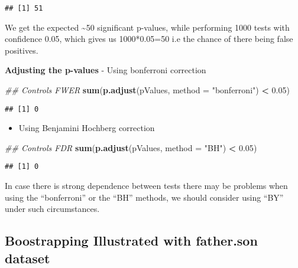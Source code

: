 \documentclass[
]{article}
\newenvironment{Shaded}{\begin{snugshade}}{\end{snugshade}}
\newcommand{\CommentTok}[1]{\textcolor[rgb]{0.56,0.35,0.01}{\textit{#1}}}
\newcommand{\DataTypeTok}[1]{\textcolor[rgb]{0.13,0.29,0.53}{#1}}
\newcommand{\FloatTok}[1]{\textcolor[rgb]{0.00,0.00,0.81}{#1}}
\newcommand{\KeywordTok}[1]{\textcolor[rgb]{0.13,0.29,0.53}{\textbf{#1}}}
\newcommand{\NormalTok}[1]{#1}
\newcommand{\OperatorTok}[1]{\textcolor[rgb]{0.81,0.36,0.00}{\textbf{#1}}}
\newcommand{\StringTok}[1]{\textcolor[rgb]{0.31,0.60,0.02}{#1}}
\providecommand{\tightlist}{%
  \setlength{\itemsep}{0pt}\setlength{\parskip}{0pt}}
\begin{document}
\begin{verbatim}
## [1] 51
\end{verbatim}

We get the expected \textasciitilde50 significant p-values, while
performing 1000 tests with confidence 0.05, which gives us 1000*0.05=50
i.e the chance of there being false positives.

\textbf{Adjusting the p-values} - Using bonferroni correction

\begin{Shaded}
\begin{Highlighting}[]
\CommentTok{## Controls FWER}
\KeywordTok{sum}\NormalTok{(}\KeywordTok{p.adjust}\NormalTok{(pValues, }\DataTypeTok{method =} \StringTok{"bonferroni"}\NormalTok{) }\OperatorTok{<}\StringTok{ }\FloatTok{0.05}\NormalTok{)}
\end{Highlighting}
\end{Shaded}

\begin{verbatim}
## [1] 0
\end{verbatim}

\begin{itemize}
\tightlist
\item
  Using Benjamini Hochberg correction
\end{itemize}

\begin{Shaded}
\begin{Highlighting}[]
\CommentTok{## Controls FDR}
\KeywordTok{sum}\NormalTok{(}\KeywordTok{p.adjust}\NormalTok{(pValues, }\DataTypeTok{method =} \StringTok{"BH"}\NormalTok{) }\OperatorTok{<}\StringTok{ }\FloatTok{0.05}\NormalTok{)}
\end{Highlighting}
\end{Shaded}

\begin{verbatim}
## [1] 0
\end{verbatim}

In case there is strong dependence between tests there may be problems
when using the ``bonferroni'' or the ``BH'' methods, we should consider
using ``BY'' under such circumstances.

\hypertarget{boostrapping-illustrated-with-father.son-dataset}{%
\subsection{Boostrapping Illustrated with father.son
dataset}\label{boostrapping-illustrated-with-father.son-dataset}}
\end{document}
